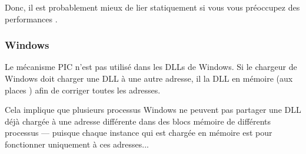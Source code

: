 Donc, il est probablement mieux de lier statiquement si vous vous préoccupez des performances .

\subsubsection{Windows}

Le mécanisme PIC n'est pas utilisé dans les DLLs de Windows. Si le chargeur de Windows doit charger une DLL
à une autre adresse, il  la DLL en mémoire (aux places ) afin de corriger toutes les
adresses.

Cela implique que plusieurs processus Windows ne peuvent pas partager une DLL déjà chargée à une adresse différente
dans des blocs mémoire de différents processus --- puisque chaque instance qui est chargée en mémoire est  pour 
fonctionner uniquement à ces adresses...

